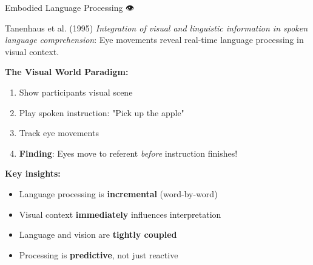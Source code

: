 \documentclass[aspectratio=169]{beamer}
\begin{document}
\begin{frame}[shrink=10]{Embodied Language Processing 👁️}
\small
    \begin{block}{Tanenhaus et al. (1995)}
        \textit{Integration of visual and linguistic information in spoken language comprehension}: Eye movements reveal real-time language processing in visual context.
    \end{block}

    \vspace{0.3cm}

    \textbf{The Visual World Paradigm:}
    \begin{enumerate}\setlength{\itemsep}{0pt}
        \item Show participants visual scene
        \item Play spoken instruction: "Pick up the apple"
        \item Track eye movements
        \item \textbf{Finding}: Eyes move to referent \textit{before} instruction finishes!
    \end{enumerate}

    \vspace{0.3cm}

    \textbf{Key insights:}
    \begin{itemize}\setlength{\itemsep}{0pt}
        \item Language processing is \textbf{incremental} (word-by-word)
        \item Visual context \textbf{immediately} influences interpretation
        \item Language and vision are \textbf{tightly coupled}
        \item Processing is \textbf{predictive}, not just reactive
    \end{itemize}
\end{frame}
\end{document}
